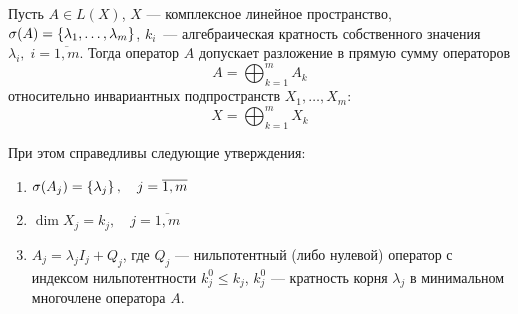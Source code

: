 \begin{theorem}\label{th:operatordecomposition}
    Пусть $A \in L(X)$, $X$ — комплексное линейное пространство, $\operatorname{\sigma}(A) =
    \left\{\lambda_1, \dotsc, \lambda_m\right\}$, $k_i$~— алгебраическая кратность
    собственного значения $\lambda_i, \; i = \overline{1,m}$.
    Тогда оператор $A$ допускает разложение в прямую сумму операторов
    \begin{equation}\label{eq:operatordecomposition}
        A = \bigoplus_{k=1}^{m} A_k
    \end{equation}
    относительно инвариантных подпространств $X_1, \dotsc, X_m$:
    \[ X = \bigoplus_{k=1}^m X_k \]

    При этом справедливы следующие утверждения:
    \begin{enumerate}
        \item $ \operatorname{\sigma}(A_j) = \left\{\lambda_j\right\}, \quad j = \overline{1,m} $
        \item $ \dim X_j = k_j, \quad j = \overline{1,m} $
        \item $ A_j = \lambda_j I_j + Q_j $, где $Q_j$ — нильпотентный (либо
            нулевой) оператор с индексом нильпотентности $k_j^0 \leq k_j$,
            $k_j^0$ — кратность корня $\lambda_j$ в минимальном многочлене
            оператора $A$.
    \end{enumerate}
\end{theorem}

